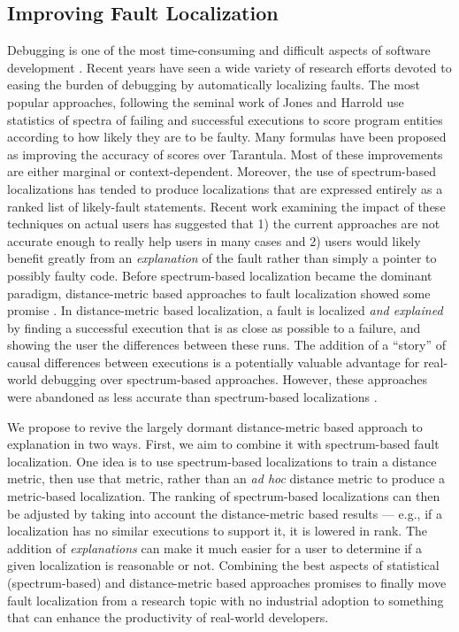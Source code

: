\subsection{Improving Fault Localization}

Debugging is one of the most time-consuming and difficult aspects of
software development \cite{Vesey,BallVis}.  Recent years have seen a
wide variety of research efforts devoted to easing the burden of
debugging by automatically localizing faults.  The most popular
approaches, following the seminal work of Jones and Harrold
\cite{Tarantula} use statistics of spectra of failing and successful
executions to score program entities according to how likely they are
to be faulty.  Many formulas have been proposed as improving the
accuracy of scores \cite{Ochai,AMPLE,Pinpoint} over Tarantula.  Most
of these improvements are either marginal or context-dependent.
Moreover, the use of spectrum-based localizations has tended to produce
localizations that are expressed entirely as a ranked list of
likely-fault statements.  Recent work examining the impact of these
techniques on actual users \cite{AutoHelp} has suggested that 1) the
current approaches are not accurate enough to really help users in
many cases and 2) users would likely benefit greatly from an
\emph{explanation} of the fault rather than simply a pointer to
possibly faulty code.  Before spectrum-based localization became the
dominant paradigm, distance-metric based approaches to fault
localization showed some promise \cite{NearNeighbor,GroceDist}.  In
distance-metric based localization, a fault is localized \emph{and
explained} by finding a successful execution that is as close as
possible to a failure, and showing the user the differences between
these runs. The addition of a ``story'' of causal differences between
executions is a potentially valuable advantage for real-world
debugging over spectrum-based approaches. However, these approaches
were abandoned as less accurate than spectrum-based localizations
\cite{Tarantula}.

We propose to revive the largely dormant distance-metric based
approach to explanation in two ways.  First, we aim to combine it with
spectrum-based fault localization.  One idea is to use spectrum-based
localizations to train a distance metric, then use that metric, rather
than an \emph{ad hoc} distance metric to produce a metric-based
localization.  The ranking of spectrum-based localizations can then be
adjusted by taking into account the distance-metric based results ---
e.g., if a localization has no similar executions to support it, it is
lowered in rank. The addition of \emph{explanations} can make it much
easier for a user to determine if a given localization is reasonable
or not.  Combining the best aspects of statistical (spectrum-based)
and distance-metric based approaches promises to finally move fault
localization from a research topic with no industrial adoption to
something that can enhance the productivity of real-world developers.

